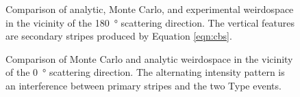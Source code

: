 \begin{figure}
\begin{center}
\end{center}
\caption{Comparison of analytic, Monte Carlo, and experimental weirdospace
in the vicinity of the \SI{180}{\degree} scattering direction.  The
vertical features are secondary stripes produced by Equation \ref{eqn:cbs}.}
\label{fig:scat180degree}
\end{figure}

\begin{figure}
\centering
{}
\caption{Comparison of Monte Carlo and analytic weirdospace in the
vicinity of the \SI{0}{\degree} scattering direction.  The alternating
intensity pattern is an interference between primary stripes and the two
Type  events.}
\label{fig:scat0degree}
\end{figure}

